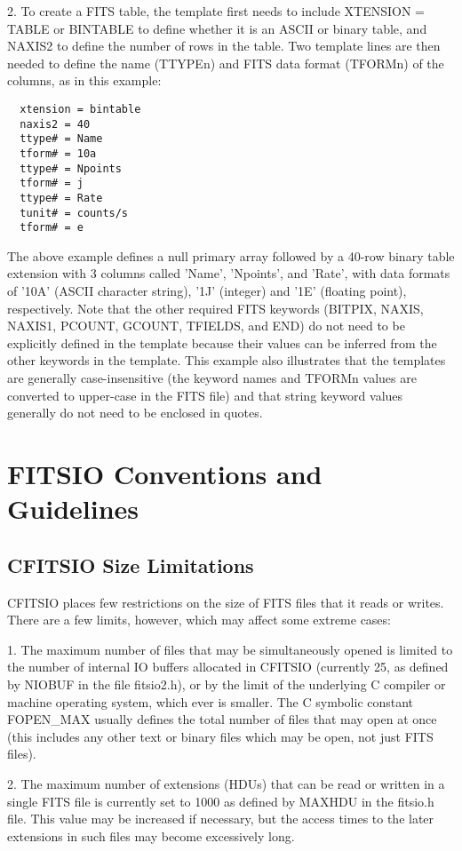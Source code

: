 \documentclass[11pt]{book}
\begin{document}
2.  To create a FITS  table, the template first needs to include
XTENSION = TABLE or BINTABLE to define whether it is an ASCII or binary
table, and NAXIS2 to define the number of rows in the table.  Two
template lines are then needed to define the name (TTYPEn) and FITS data
format (TFORMn) of the columns, as in this example:

\begin{verbatim}
  xtension = bintable
  naxis2 = 40
  ttype# = Name
  tform# = 10a
  ttype# = Npoints
  tform# = j
  ttype# = Rate
  tunit# = counts/s
  tform# = e
\end{verbatim}
The above example defines a null primary array followed by a 40-row
binary table extension with 3 columns called 'Name', 'Npoints', and
'Rate', with data formats of '10A' (ASCII character string), '1J'
(integer) and '1E' (floating point), respectively.  Note that the other
required FITS keywords (BITPIX, NAXIS, NAXIS1, PCOUNT, GCOUNT, TFIELDS,
and END) do not need to be explicitly defined in the template because
their values can be inferred from the other keywords in the template.
This example also illustrates that the templates are generally
case-insensitive (the keyword names and TFORMn values are converted to
upper-case in the FITS file) and that string keyword values generally
do not need to be enclosed in quotes.

\chapter{FITSIO Conventions and Guidelines }


\section{CFITSIO Size Limitations}

CFITSIO places few restrictions on the size of FITS files that it
reads or writes.  There are a few limits, however, which may affect
some extreme cases:

1.  The maximum number of files that may be simultaneously opened is
limited to the number of internal IO buffers allocated in CFITSIO
(currently 25, as defined by NIOBUF in the file fitsio2.h), or by the
limit of the underlying C compiler or machine operating system, which
ever is smaller.  The C symbolic constant FOPEN\_MAX usually defines
the total number of files that may open at once (this includes any
other text or binary files which may be open, not just FITS files).

2.  The maximum number of extensions (HDUs) that can be read or written
in a single FITS file is currently set to 1000 as defined by MAXHDU in
the fitsio.h file.  This value may be increased if necessary, but the
access times to the later extensions in such files may become excessively
long.
\end{document}
